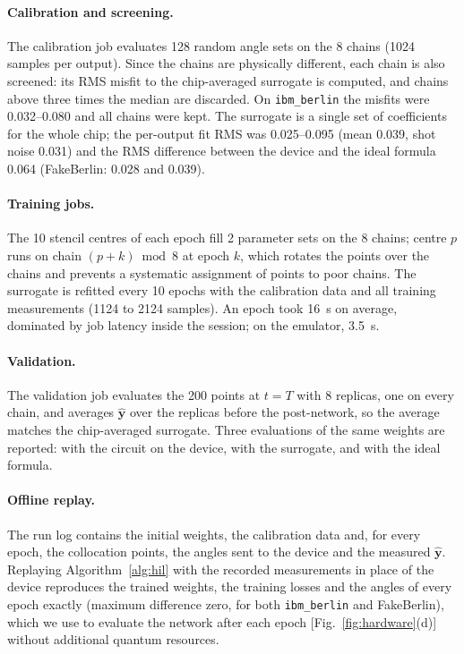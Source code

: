 \documentclass[floatfix,aps,pra,twocolumn,superscriptaddress,10pt,nofootinbib]{revtex4-2}
\begin{document}
\begin{appendices}
\paragraph{Calibration and screening.} The calibration job evaluates 128 random angle sets on the 8 chains (1024 samples per output). Since the chains are physically different, each chain is also screened: its RMS misfit to the chip-averaged surrogate is computed, and chains above three times the median are discarded. On \texttt{ibm\_berlin} the misfits were 0.032--0.080 and all chains were kept. The surrogate is a single set of coefficients for the whole chip; the per-output fit RMS was 0.025--0.095 (mean 0.039, shot noise 0.031) and the RMS difference between the device and the ideal formula 0.064 (FakeBerlin: 0.028 and 0.039).

\paragraph{Training jobs.} The 10 stencil centres of each epoch fill 2 parameter sets on the 8 chains; centre $p$ runs on chain $(p+k)\bmod8$ at epoch $k$, which rotates the points over the chains and prevents a systematic assignment of points to poor chains. The surrogate is refitted every 10 epochs with the calibration data and all training measurements (1124 to 2124 samples). An epoch took 16~s on average, dominated by job latency inside the session; on the emulator, 3.5~s.

\paragraph{Validation.} The validation job evaluates the 200 points at $t=T$ with 8 replicas, one on every chain, and averages $\hat{\bm y}$ over the replicas before the post-network, so the average matches the chip-averaged surrogate. Three evaluations of the same weights are reported: with the circuit on the device, with the surrogate, and with the ideal formula.

\paragraph{Offline replay.} The run log contains the initial weights, the calibration data and, for every epoch, the collocation points, the angles sent to the device and the measured $\hat{\bm y}$. Replaying Algorithm~\ref{alg:hil} with the recorded measurements in place of the device reproduces the trained weights, the training losses and the angles of every epoch exactly (maximum difference zero, for both \texttt{ibm\_berlin} and FakeBerlin), which we use to evaluate the network after each epoch [Fig.~\ref{fig:hardware}(d)] without additional quantum resources.


\end{appendices}
\end{document}
